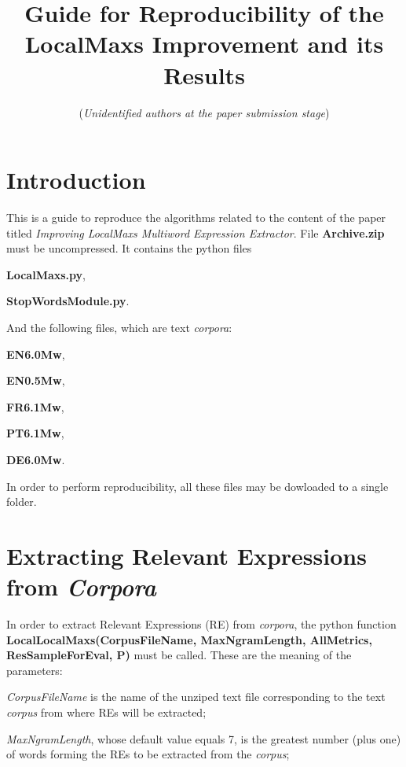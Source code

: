 \documentclass{article}
\begin{document}
\title{Guide for Reproducibility of the LocalMaxs Improvement and its Results}
\maketitle
\author{(\textit{Unidentified authors at the paper submission stage})}
\section{Introduction}
This is a guide to reproduce the algorithms related to the content of the paper titled \textit{Improving LocalMaxs Multiword Expression Extractor}. File \textbf{Archive.zip} must be uncompressed. It contains the python files 

\vspace{7px}
\textbf{LocalMaxs.py},

 \textbf{StopWordsModule.py}. 
 
 \vspace{7px}
 And the following files, which are text \textit{corpora}: 
 
 \vspace{7px}
 
\textbf{EN6.0Mw}, 
 
 \textbf{EN0.5Mw}, 
 
 \textbf{FR6.1Mw},

 \textbf{PT6.1Mw},

 \textbf{DE6.0Mw}.
 
 \vspace{7px}
 In order to perform reproducibility, all these files may be dowloaded to a single folder.
 
\section{Extracting Relevant Expressions from \textit{Corpora}}\label{wk}
In order to extract Relevant Expressions (RE) from \textit{corpora}, the python function \textbf{LocalLocalMaxs(CorpusFileName, MaxNgramLength, AllMetrics, ResSampleForEval, P)} must be called. These are the meaning of the parameters:

\vspace{7px}
\textit{CorpusFileName} is the name of the unziped text file corresponding to the text \textit{corpus} from where REs will be extracted;

\vspace{7px}
\textit{MaxNgramLength}, whose default value equals 7, is the greatest number (plus one) of words forming the REs to be extracted from the \textit{corpus}; 
\end{document}
